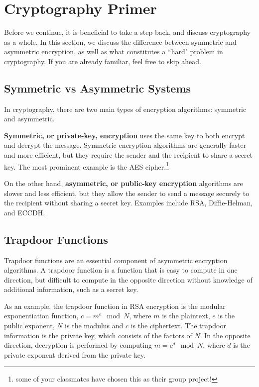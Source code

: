 \documentclass{article}
\begin{document}
\section*{Cryptography Primer}
    Before we continue, it is beneficial to take a step back, and discuss cryptography as a whole. In this section, we discuss the difference between symmetric and asymmetric encryption, as well as what constitutes a ``hard" problem in cryptography. If you are already familiar, feel free to skip ahead.

\subsection*{Symmetric vs Asymmetric Systems}

    In cryptography, there are two main types of encryption algorithms: symmetric and asymmetric. 

    \vspace{3mm}
    \textbf{Symmetric, or private-key, encryption} uses the same key to both encrypt and decrypt the message. Symmetric encryption algorithms are generally faster and more efficient, but they require the sender and the recipient to share a secret key. The most prominent example is the AES cipher.\footnote{some of your classmates have chosen this as their group project!} 

    \vspace{3mm}
    On the other hand, \textbf{asymmetric, or public-key encryption} algorithms are slower and less efficient, but they allow the sender to send a message securely to the recipient without sharing a secret key. Examples include RSA, Diffie-Helman, and ECCDH.

\subsection*{Trapdoor Functions}
    
    Trapdoor functions are an essential component of asymmetric encryption algorithms. A trapdoor function is a function that is easy to compute in one direction, but difficult to compute in the opposite direction without knowledge of additional information, such as a secret key.
    
    \vspace{2mm}
    As an example, the trapdoor function in RSA encryption is the modular exponentiation function, $c = m^e \mod N$, where $m$ is the plaintext, $e$ is the public exponent, $N$ is the modulus and $c$ is the ciphertext. The trapdoor information is the private key, which consists of the factors of $N$. In the opposite direction, decryption is performed by computing $m = c^d \mod N$, where $d$ is the private exponent derived from the private key.
\end{document}
